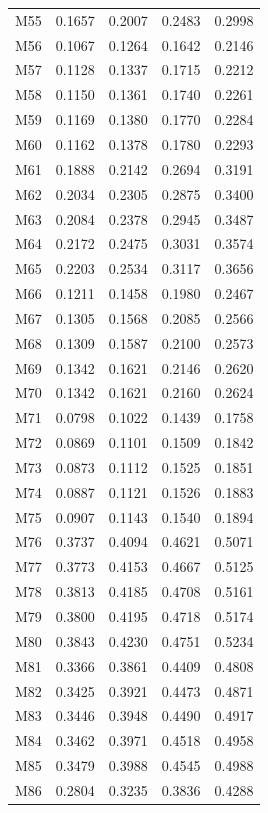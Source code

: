 \begin{longtable}{lrrrr}
M55 & 0.1657 & 0.2007 & 0.2483 & 0.2998 \\
M56 & 0.1067 & 0.1264 & 0.1642 & 0.2146 \\
M57 & 0.1128 & 0.1337 & 0.1715 & 0.2212 \\
M58 & 0.1150 & 0.1361 & 0.1740 & 0.2261 \\
M59 & 0.1169 & 0.1380 & 0.1770 & 0.2284 \\
M60 & 0.1162 & 0.1378 & 0.1780 & 0.2293 \\
M61 & 0.1888 & 0.2142 & 0.2694 & 0.3191 \\
M62 & 0.2034 & 0.2305 & 0.2875 & 0.3400 \\
M63 & 0.2084 & 0.2378 & 0.2945 & 0.3487 \\
M64 & 0.2172 & 0.2475 & 0.3031 & 0.3574 \\
M65 & 0.2203 & 0.2534 & 0.3117 & 0.3656 \\
M66 & 0.1211 & 0.1458 & 0.1980 & 0.2467 \\
M67 & 0.1305 & 0.1568 & 0.2085 & 0.2566 \\
M68 & 0.1309 & 0.1587 & 0.2100 & 0.2573 \\
M69 & 0.1342 & 0.1621 & 0.2146 & 0.2620 \\
M70 & 0.1342 & 0.1621 & 0.2160 & 0.2624 \\
M71 & 0.0798 & 0.1022 & 0.1439 & 0.1758 \\
M72 & 0.0869 & 0.1101 & 0.1509 & 0.1842 \\
M73 & 0.0873 & 0.1112 & 0.1525 & 0.1851 \\
M74 & 0.0887 & 0.1121 & 0.1526 & 0.1883 \\
M75 & 0.0907 & 0.1143 & 0.1540 & 0.1894 \\
M76 & 0.3737 & 0.4094 & 0.4621 & 0.5071 \\
M77 & 0.3773 & 0.4153 & 0.4667 & 0.5125 \\
M78 & 0.3813 & 0.4185 & 0.4708 & 0.5161 \\
M79 & 0.3800 & 0.4195 & 0.4718 & 0.5174 \\
M80 & 0.3843 & 0.4230 & 0.4751 & 0.5234 \\
M81 & 0.3366 & 0.3861 & 0.4409 & 0.4808 \\
M82 & 0.3425 & 0.3921 & 0.4473 & 0.4871 \\
M83 & 0.3446 & 0.3948 & 0.4490 & 0.4917 \\
M84 & 0.3462 & 0.3971 & 0.4518 & 0.4958 \\
M85 & 0.3479 & 0.3988 & 0.4545 & 0.4988 \\
M86 & 0.2804 & 0.3235 & 0.3836 & 0.4288 \\

\end{longtable}
